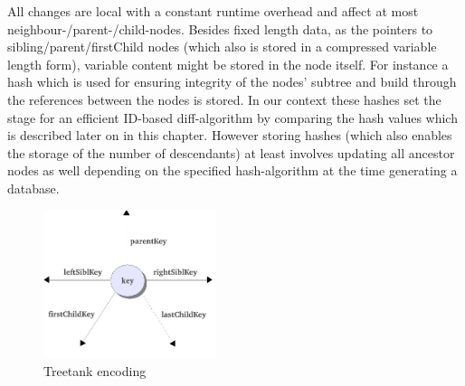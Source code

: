 \begin{description}



All changes are local with a constant runtime overhead and affect at most neighbour-/parent-/child-nodes. Besides fixed length data, as the pointers to sibling/parent/firstChild nodes (which also is stored in a compressed variable length form), variable content might be stored in the node itself. For instance a hash which is used for ensuring integrity of the nodes' subtree and build through the references between the nodes is stored. In our context these hashes set the stage for an efficient ID-based diff-algorithm by comparing the hash values which is described later on in this chapter. However storing hashes (which also enables the storage of the number of descendants) at least involves updating all ancestor nodes as well depending on the specified hash-algorithm at the time generating a database.

\begin{figure}[tb]
\centering
\includegraphics[width=0.45\textwidth]{figures/encoding}
\caption{Treetank encoding} 
\label{fig:encoding}
\end{figure}


\end{description}
